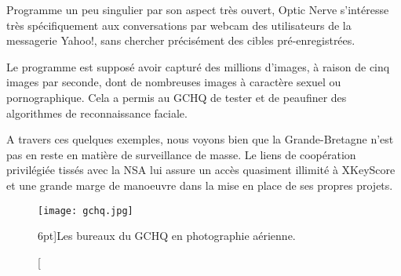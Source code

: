 Programme un peu singulier par son aspect très ouvert, Optic Nerve
s'intéresse très spécifiquement aux conversations par webcam des utilisateurs de
la messagerie Yahoo!\citep{yahoocam}, sans chercher précisément des cibles
pré-enregistrées.

Le programme est supposé avoir capturé des millions d'images, à
raison de cinq images par seconde\citep{latribune}, dont de nombreuses images à
caractère sexuel ou pornographique. Cela a permis au GCHQ de tester et de
peaufiner des algorithmes de reconnaissance faciale.

A travers ces quelques exemples, nous voyons bien que la
Grande-Bretagne n'est pas en reste en matière de surveillance de masse. Le liens
de coopération privilégiée tissés avec la NSA lui assure un accès quasiment
illimité à XKeyScore et une grande marge de manoeuvre dans la mise en place de
ses propres projets.

\begin{figure}
\texttt{[image: gchq.jpg]}
\caption[Les bureaux du GCHQ en photographie aérienne][6pt]{Les bureaux du GCHQ en photographie aérienne.}
\label{fig:gchq}
\end{figure}